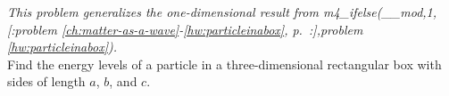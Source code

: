\emph{This problem generalizes the one-dimensional result from
m4_ifelse(__mod,1,[:problem \ref{ch:matter-as-a-wave}-\ref{hw:particleinabox}, p.~\pageref{hw:particleinabox}:],problem \ref{hw:particleinabox}).}\\
Find the energy levels of a particle in a three-dimensional rectangular box with sides
of length $a$, $b$, and $c$.\answercheck
